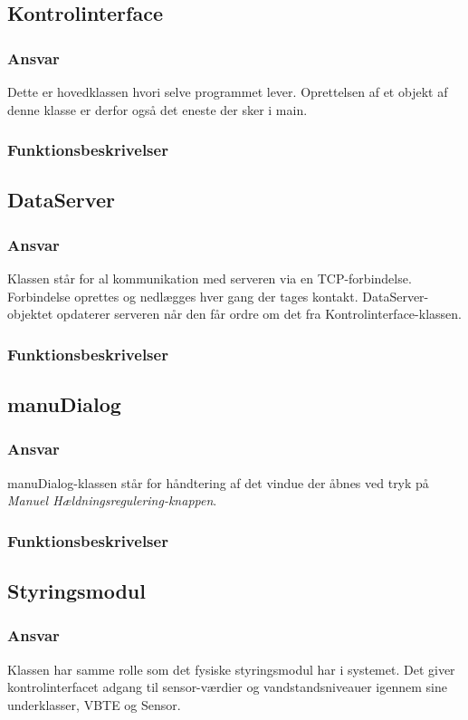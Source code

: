 \subsection{Kontrolinterface}
\subsubsection{Ansvar}
Dette er hovedklassen hvori selve programmet lever. Oprettelsen af et objekt af denne klasse er derfor også det eneste der sker i main.
\subsubsection{Funktionsbeskrivelser}

\subsection{DataServer}
\subsubsection{Ansvar}
Klassen står for al kommunikation med serveren via en TCP-forbindelse. Forbindelse oprettes og nedlægges hver gang der tages kontakt. DataServer-objektet opdaterer serveren når den får ordre om det fra Kontrolinterface-klassen.
\subsubsection{Funktionsbeskrivelser}

\subsection{manuDialog}
\subsubsection{Ansvar}
manuDialog-klassen står for håndtering af det vindue der åbnes ved tryk på \textit{Manuel Hældningsregulering-knappen}.
\subsubsection{Funktionsbeskrivelser}

\subsection{Styringsmodul}
\subsubsection{Ansvar}
Klassen har samme rolle som det fysiske styringsmodul har i systemet. Det giver kontrolinterfacet adgang til sensor-værdier og vandstandsniveauer igennem sine underklasser, VBTE og Sensor.
